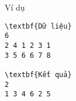 Ví dụ  
\begin{verbatim}
\textbf{Dữ liệu}
6
2 4 1 2 3 1
3 5 6 6 7 8

\textbf{Kết quả}
2
1 3 4 6 2 5
\end{verbatim}